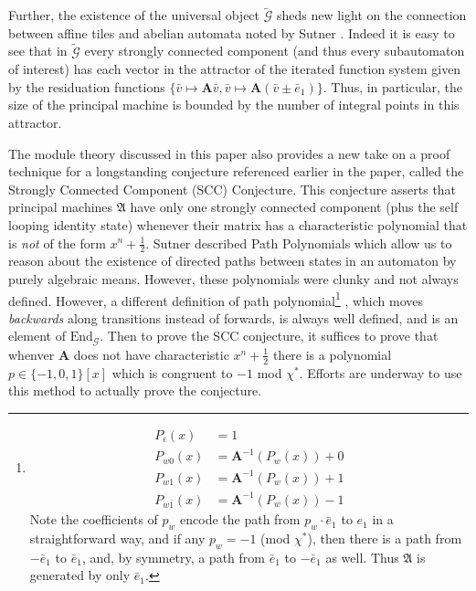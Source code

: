 \documentclass[12pt]{article}
\newcommand{\G}{\mathcal{G}}
\renewcommand{\P}{\mathfrak{A}}
\newcommand{\2}{\textbf{2}}
\newcommand{\Am}{\textbf{A}}
\renewcommand{\v}{\bar{v}}
\newcommand{\e}{\bar{e}}
\begin{document}
Further, the existence of the universal object $\widetilde{\G}$ sheds new light
on the connection between affine tiles 
\cite{LagariasWang96:tiles, LagariasWang97:integral_tiles}
and abelian automata noted by Sutner
\cite{Sutner18:abelian_automata}. Indeed it is easy to see that in 
$\widetilde{\G}$ every strongly connected component 
(and thus every subautomaton of interest) has each vector in the attractor 
of the iterated function system given by the residuation functions 
$\{ \v \mapsto \Am \v, \v \mapsto \Am (\v \pm \e_1) \}$.
Thus, in particular, the size of the principal machine is bounded by the
number of integral points in this attractor. 

The module theory discussed in this paper also provides a new take on a
proof technique for a longstanding conjecture referenced earlier in the paper,
called the Strongly Connected Component (SCC) Conjecture. This conjecture 
asserts that principal machines $\P$ have only one strongly connected component 
(plus the self looping identity state) whenever their matrix has a 
characteristic polynomial that is \emph{not} of the form $x^n + \frac{1}{2}$.
Sutner described Path Polynomials \cite{Sutner18:abelian_automata} which
allow us to reason about the existence of directed paths between states 
in an automaton by purely algebraic means. However, these polynomials were
clunky and not always defined. However, a different definition of path 
polynomial\footnote{%
  \begin{align*}
    P_\epsilon(x)   &= 1\\
    P_{w0}(x)       &= \Am^{-1}(P_w(x)) + 0\\
    P_{w1}(x)       &= \Am^{-1}(P_w(x)) + 1\\
    P_{w\bar{1}}(x) &= \Am^{-1}(P_w(x)) - 1
  \end{align*}
  Note the coefficients of $p_w$ encode the path from 
  $p_w \cdot \e_1$ to $e_1$ in a straightforward way,
  and if any $p_w = -1$ (mod $\chi^*$), 
  then there is a path from $-\e_1$ to $\e_1$, and,
  by symmetry, a path from $\e_1$ to $-\e_1$ as well. Thus $\P$ is
  generated by only $\e_1$.
}
, which moves \emph{backwards} along transitions 
instead of forwards, is always well defined, and is an element of 
$\text{End}_{\G}$. Then to prove the SCC conjecture, it suffices to prove 
that whenver $\Am$ does not have characteristic $x^n + \frac{1}{2}$
there is a polynomial $p \in \{-1,0,1\}[x]$ which is congruent to $-1$ mod
$\chi^*$. Efforts are underway to use this method to actually prove the 
conjecture.

\newpage



\end{document}
